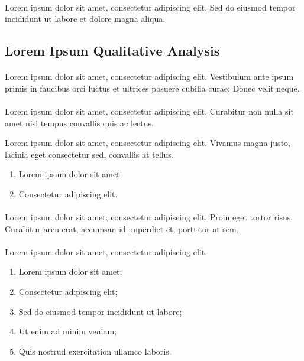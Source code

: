 \paragraph{}
Lorem ipsum dolor sit amet, consectetur adipiscing elit. Sed do eiusmod tempor incididunt ut labore et dolore magna aliqua.

\subsection*{Lorem Ipsum Qualitative Analysis}

\paragraph{}
Lorem ipsum dolor sit amet, consectetur adipiscing elit. Vestibulum ante ipsum primis in faucibus orci luctus et ultrices posuere cubilia curae; Donec velit neque.

\paragraph{}
Lorem ipsum dolor sit amet, consectetur adipiscing elit. Curabitur non nulla sit amet nisl tempus convallis quis ac lectus.

Lorem ipsum dolor sit amet, consectetur adipiscing elit. Vivamus magna justo, lacinia eget consectetur sed, convallis at tellus.
\begin{enumerate}
\item Lorem ipsum dolor sit amet;
\item Consectetur adipiscing elit.
\end{enumerate}

\paragraph{}
Lorem ipsum dolor sit amet, consectetur adipiscing elit. Proin eget tortor risus. Curabitur arcu erat, accumsan id imperdiet et, porttitor at sem.

\paragraph{}
Lorem ipsum dolor sit amet, consectetur adipiscing elit.
\begin{enumerate}
\item Lorem ipsum dolor sit amet;
\item Consectetur adipiscing elit;
\item Sed do eiusmod tempor incididunt ut labore;
\item Ut enim ad minim veniam;
\item Quis nostrud exercitation ullamco laboris.
\end{enumerate}

